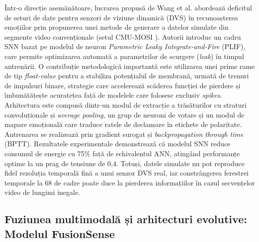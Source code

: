 Într-o direcție asemănătoare, lucrarea propusă de Wang et al. \cite{wang2022} abordează deficitul de seturi de date pentru senzori de viziune dinamică (DVS) în recunoașterea emoțiilor prin propunerea unei metode de generare a datelor simulate din segmente video convenționale (setul CMU-MOSI \cite{zadeh2016}). Autorii introduc un cadru SNN bazat pe modelul de neuron \textit{Parametric Leaky Integrate-and-Fire} (PLIF), care permite optimizarea automată a parametrilor de scurgere (\textit{leak}) în timpul antrenării. O contribuție metodologică importantă este utilizarea unei prime rame de tip \textit{float-value} pentru a stabiliza potențialul de membrană, urmată de trenuri de impulsuri binare, strategie care accelerează scăderea funcției de pierdere și îmbunătățește a\-cu\-ra\-te\-țea față de modelele care folosesc exclusiv \textit{spikes}. Arhitectura este compusă dintr-un modul de extracție a trăsăturilor cu straturi convoluționale și \textit{average pooling}, un grup de neuroni de votare și un modul de mapare emoțională care traduce ratele de declanșare în etichete de polaritate. Antrenarea se realizează prin gradient surogat și \textit{backpropagation through time} (BPTT). Rezultatele experimentale demonstrează că modelul SNN reduce consumul de energie cu 75\% față de echivalentul ANN, atingând performanțe optime la un prag de tensiune de 0,4. Totuși, datele simulate nu pot reproduce fidel rezoluția temporală fină a unui senzor DVS real, iar constrângerea ferestrei temporale la 68 de cadre poate duce la pierderea informațiilor în cazul secvențelor video de lungimi inegale.

\subsection*{Fuziunea multimodală și arhitecturi evolutive: Modelul FusionSense}

